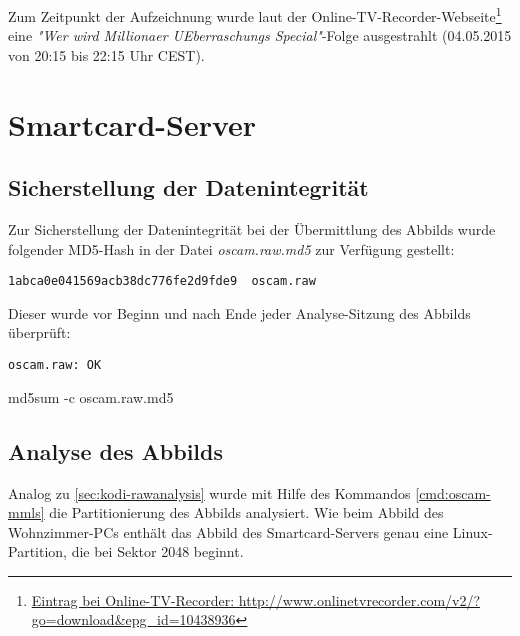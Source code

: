 Zum Zeitpunkt der Aufzeichnung wurde laut der Online-TV-Recorder-Webseite\footnote{\href{http://www.onlinetvrecorder.com/v2/?go=download\&epg\_id=10438936}{Eintrag bei Online-TV-Recorder: http://www.onlinetvrecorder.com/v2/?go=download\&epg\_id=10438936}} eine \textit{"Wer wird Millionaer UEberraschungs Special"}-Folge ausgestrahlt (04.05.2015 von 20:15 bis 22:15 Uhr CEST).

\section{Smartcard-Server}

\subsection{Sicherstellung der Datenintegrität}

Zur Sicherstellung der Datenintegrität bei der Übermittlung des Abbilds wurde folgender MD5-Hash in der Datei \textit{oscam.raw.md5} zur Verfügung gestellt:

\begin{verbatim}
1abca0e041569acb38dc776fe2d9fde9  oscam.raw
\end{verbatim}

Dieser wurde vor Beginn und nach Ende jeder Analyse-Sitzung des Abbilds überprüft:

\begin{cmd}
\begin{verbatim}
oscam.raw: OK
\end{verbatim}
\caption{md5sum -c oscam.raw.md5}
\end{cmd}

\subsection{Analyse des Abbilds}

Analog zu \autoref{sec:kodi-rawanalysis} wurde mit Hilfe des Kommandos \autoref{cmd:oscam-mmls} die Partitionierung des Abbilds analysiert. Wie beim Abbild des Wohnzimmer-PCs enthält das Abbild des Smartcard-Servers genau eine Linux-Partition, die bei Sektor 2048 beginnt.